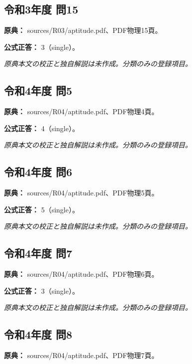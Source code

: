 \subsection{令和3年度 問15}
\label{q:r03-reg-apt-15}

\noindent\textbf{原典：} sources/R03/aptitude.pdf、PDF物理15頁。

\textbf{公式正答：} 3（single）。

\par\textit{原典本文の校正と独自解説は未作成。分類のみの登録項目。}

\subsection{令和4年度 問5}
\label{q:r04-reg-apt-05}

\noindent\textbf{原典：} sources/R04/aptitude.pdf、PDF物理4頁。

\textbf{公式正答：} 4（single）。

\par\textit{原典本文の校正と独自解説は未作成。分類のみの登録項目。}

\subsection{令和4年度 問6}
\label{q:r04-reg-apt-06}

\noindent\textbf{原典：} sources/R04/aptitude.pdf、PDF物理5頁。

\textbf{公式正答：} 5（single）。

\par\textit{原典本文の校正と独自解説は未作成。分類のみの登録項目。}

\subsection{令和4年度 問7}
\label{q:r04-reg-apt-07}

\noindent\textbf{原典：} sources/R04/aptitude.pdf、PDF物理6頁。

\textbf{公式正答：} 3（single）。

\par\textit{原典本文の校正と独自解説は未作成。分類のみの登録項目。}

\subsection{令和4年度 問8}
\label{q:r04-reg-apt-08}

\noindent\textbf{原典：} sources/R04/aptitude.pdf、PDF物理7頁。


